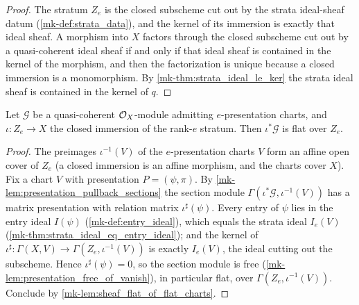 \begin{proof}
  \leanok
  The stratum \(Z_e\) is the closed subscheme cut out by the strata
  ideal-sheaf datum (\ref{mk-def:strata_data}), and the kernel of its
  immersion is exactly that ideal sheaf.  A morphism into \(X\) factors
  through the closed subscheme cut out by a quasi-coherent ideal sheaf if
  and only if that ideal sheaf is contained in the kernel of the morphism,
  and then the factorization is unique because a closed immersion is a
  monomorphism.  By \ref{mk-thm:strata_ideal_le_ker} the strata ideal sheaf is
  contained in the kernel of \(q\).
\end{proof}

\begin{theorem}
  \label{mk-thm:stratum_flattens}
  \leanok

  Let \(\mathcal G\) be a quasi-coherent \(\mathcal{O}_X\)-module admitting
  \(e\)-presentation charts, and \(\iota : Z_e \to X\) the closed immersion
  of the rank-\(e\) stratum.  Then \(\iota^*\mathcal G\) is flat over
  \(Z_e\).
\end{theorem}

\begin{proof}
  \leanok
  The preimages \(\iota^{-1}(V)\) of the \(e\)-presentation charts \(V\)
  form an affine open cover of \(Z_e\) (a closed immersion is an affine
  morphism, and the charts cover \(X\)).  Fix a chart \(V\) with
  presentation \(P = (\psi, \pi)\).  By
  \ref{mk-lem:presentation_pullback_sections} the section module
  \(\Gamma(\iota^*\mathcal G, \iota^{-1}(V))\) has a matrix presentation
  with relation matrix \(\iota^\sharp(\psi)\).  Every entry of \(\psi\) lies
  in the entry ideal \(I(\psi)\) (\ref{mk-def:entry_ideal}), which equals the
  strata ideal \(I_e(V)\) (\ref{mk-thm:strata_ideal_eq_entry_ideal}); and the
  kernel of \(\iota^\sharp : \Gamma(X, V) \to \Gamma(Z_e, \iota^{-1}(V))\)
  is exactly \(I_e(V)\), the ideal cutting out the subscheme.  Hence
  \(\iota^\sharp(\psi) = 0\), so the section module is free
  (\ref{mk-lem:presentation_free_of_vanish}), in particular flat, over
  \(\Gamma(Z_e, \iota^{-1}(V))\).  Conclude by
  \ref{mk-lem:sheaf_flat_of_flat_charts}.
\end{proof}

